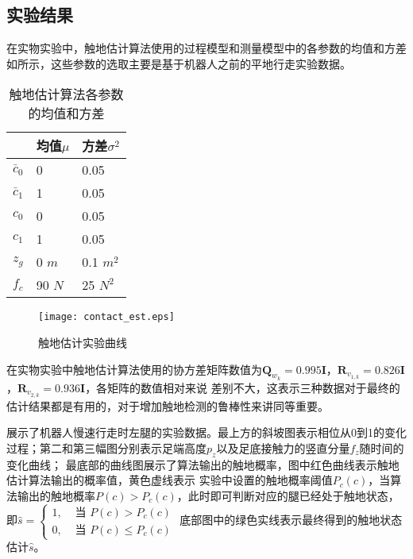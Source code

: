 \subsection{实验结果}
在实物实验中，触地估计算法使用的过程模型和测量模型中的各参数的均值和方差如所示，这些参数的选取主要是基于机器人之前的平地行走实验数据。
\begin{table}[htbp]
	\centering
	\caption{触地估计算法各参数的均值和方差}
	\label{tab:contact_para}
	\begin{tabular}{m{2cm}<{\centering}m{3cm}<{\centering}m{3cm}<{\centering}}
		\toprule  %
		\fangsong{参数名称}   & 均值$\mu$ & 方差$\sigma^2$  \\
		\midrule  %
		$\bar{c}_0$    & 0 & 0.05\\
		$\bar{c}_1$ & 1 & 0.05 \\
		${c}_0$ & 0 & 0.05 \\
        ${c}_1$ & 1 & 0.05 \\
        ${z}_g$ & 0 $m$ & 0.1 $m^2$ \\
        ${f}_c$ & 90 $N$ & 25 $N^2$ \\
		\bottomrule %
	\end{tabular}
\end{table}
\begin{figure}[h]
    \centering
    \texttt{[image: contact\_est.eps]}
    \caption{\label{fig:contact_est}触地估计实验曲线}
\end{figure}
在实物实验中触地估计算法使用的协方差矩阵数值为$\boldsymbol{Q}_{w_k}=0.995\mathbf{I}$，$\boldsymbol{R}_{v_{1,k}}=0.826 \mathbf{I}$，$\boldsymbol{R}_{v_{2,k}}=0.936 \mathbf{I}$，各矩阵的数值相对来说
差别不大，这表示三种数据对于最终的估计结果都是有用的，对于增加触地检测的鲁棒性来讲同等重要。

展示了机器人慢速行走时左腿的实验数据。最上方的斜坡图表示相位从0到1的变化过程；第二和第三幅图分别表示足端高度$p_z$以及足底接触力的竖直分量$f_z$随时间的变化曲线；
最底部的曲线图展示了算法输出的触地概率，图中红色曲线表示触地估计算法输出的概率值，黄色虚线表示
实验中设置的触地概率阈值$P_{c}(c)$，当算法输出的触地概率$P(c)>P_{c}(c)$，此时即可判断对应的腿已经处于触地状态，
即$\hat{s}= \begin{cases}1, & \text { 当 } P(c)>P_c(c) \\ 0, & \text { 当 } P(c) \leq P_c(c)\end{cases}$
底部图中的绿色实线表示最终得到的触地状态估计$\hat{s}$。

